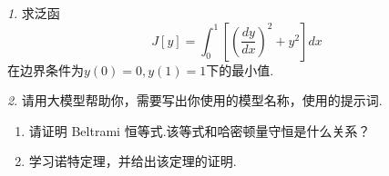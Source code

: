 \documentclass[11pt]{article}
\theoremstyle{remark}
\newtheorem{problem}{}
\begin{document}
\begin{problem}
  求泛函
  $$
  J[y] = \int_0^1 \left[ \left(\frac{dy}{dx}\right)^2 + y^2 \right] dx
  $$
  在边界条件为$y(0) = 0, y(1) = 1$下的最小值.
\end{problem}

\vspace{2em}


\begin{problem}
  请用大模型帮助你，需要写出你使用的模型名称，使用的提示词.
  \begin{enumerate}
    \item 请证明 Beltrami 恒等式.该等式和哈密顿量守恒是什么关系？
    \item 学习诺特定理，并给出该定理的证明.
  \end{enumerate}
\end{problem}
\end{document}
